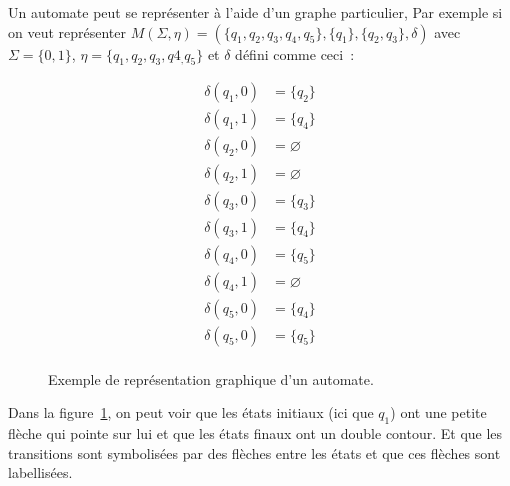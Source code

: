 \documentclass[12pt]{article}
\begin{document}
Un automate peut se représenter à l'aide d'un graphe particulier, Par exemple
si on veut représenter \(M(\Sigma, \eta) = (\{q_1, q_2, q_3, q_4, q_5\},
\{q_1\},\{q_2, q_3\}, \delta)\) avec \(\Sigma = \{0, 1\}\), \(\eta = \{q_1,
q_2, q_3, q4_, q_5\}\) et \(\delta\) défini comme ceci~:

\begin{align*}
    \delta(q_1, 0) & = \{q_2\}     \\
    \delta(q_1, 1) & = \{q_4\}     \\
    \delta(q_2, 0) & = \varnothing \\
    \delta(q_2, 1) & = \varnothing \\
    \delta(q_3, 0) & = \{q_3\}     \\
    \delta(q_3, 1) & = \{q_4\}     \\
    \delta(q_4, 0) & = \{q_5\}     \\
    \delta(q_4, 1) & = \varnothing \\
    \delta(q_5, 0) & = \{q_4\}     \\
    \delta(q_5, 0) & = \{q_5\}     \\
\end{align*}

\begin{figure}[H]
    \centering
    \captionsetup{type=figure,justification=centering}
    \caption{
        Exemple de représentation graphique d'un automate.
    }\label{fig:automata}
\end{figure}

Dans la figure~\ref{fig:automata}, on peut voir que les états initiaux (ici que
\(q_1\)) ont une petite flèche qui pointe sur lui et que les états finaux ont
un double contour. Et que les transitions sont symbolisées par des flèches
entre les états et que ces flèches sont labellisées.
\end{document}

